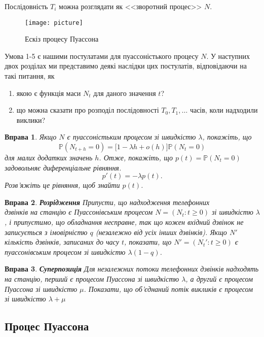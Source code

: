 \documentclass[12pt,fleqn]{article}
\newtheorem{exercise}{Вправа}[section]
\numberwithin{figure}{section}
\numberwithin{equation}{section}
\begin{document}
Послідовність $T_i$ можна розглядати як <<зворотний процес>> $N$.

\begin{figure}
  \centering
  \texttt{[image: picture]}
  \caption{Ескіз процесу Пуассона}\label{pic1}
\end{figure}

Умова 1-5 є нашими постулатами для пуассоністького процесу $N$. У наступних двох розділах ми представимо деякі наслідки цих постулатів, відповідаючи на такі питання, як
\begin{enumerate}
  \item якою є функція маси $N_t$ для даного значення $t$?
  \item що можна сказати про розподіл послідовності $T_0, T_1, \dots$ часів, коли надходили виклики?
\end{enumerate}

\begin{exercise}
Якщо $N$ є пуассоністьким процесом зі швидкістю $\lambda$, покажіть, що
$$\mathbb{P}(N_{t+h}=0)=\big[1-\lambda h +o(h)\big]\mathbb{P}(N_t=0)$$
для малих додатких значень $h$. Отже, покажіть, що $p(t)=\mathbb{P}(N_t=0)$ задовольняє диференціальне рівняння.
$$p'(t)=-\lambda p(t).$$
Розв'яжіть це рівняння, щоб знайти $p(t)$.
\end{exercise}

\begin{exercise}
  \textbf{Розрідження} Припусти, що надходження телефонних \\дзвінків на станцію є Пуассонівським процесом $N=(N_t:t\geq0)$ зі швидкістю $\lambda$, і припустимо, що обладнання несправне, так що кожен вхідний дзвінок не записується з імовірністю $q$ (незалежно від усіх інших дзвінків). Якщо $N'$ кількість дзвінків, записаних до часу $t$, показати, що $N'=(N_{t}':t\geq 0)$ є пуассонівським процесом зі швидкістю $\lambda(1-q)$.
\end{exercise}

\begin{exercise}\label{exercise.11.5}
  \textbf{Суперпозиція} Для незалежних потоки телефонних дзвінків надходять на станцію, перший є процесом Пуассона зі швидкістю $\lambda$, а другий є процесом Пуассона зі швидкістю $\mu$. Показати, що об'єднаний потік викликів є процесом зі швидкістю $\lambda + \mu$
\end{exercise}

\subsection{Процес Пуассона}
\end{document}
